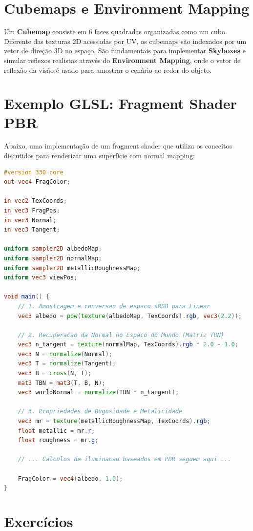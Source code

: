 \section{Cubemaps e Environment Mapping}

Um \textbf{Cubemap} consiste em 6 faces quadradas organizadas como um cubo. 
Diferente das texturas 2D acessadas por UV, os cubemaps são indexados por um vetor de direção 3D no espaço. 
São fundamentais para implementar \textbf{Skyboxes} e simular reflexos realistas através do \textbf{Environment Mapping}, onde o vetor de reflexão da visão é usado para amostrar o cenário ao redor do objeto.

\section{Exemplo GLSL: Fragment Shader PBR}

Abaixo, uma implementação de um fragment shader que utiliza os conceitos discutidos para renderizar uma superfície com normal mapping:

\begin{lstlisting}[language=GLSL, caption={Fragment Shader PBR com Normal Mapping e Espaço Tangente}]
#version 330 core
out vec4 FragColor;

in vec2 TexCoords;
in vec3 FragPos;
in vec3 Normal;
in vec3 Tangent;

uniform sampler2D albedoMap;
uniform sampler2D normalMap;
uniform sampler2D metallicRoughnessMap;
uniform vec3 viewPos;

void main() {
    // 1. Amostragem e conversao de espaco sRGB para Linear
    vec3 albedo = pow(texture(albedoMap, TexCoords).rgb, vec3(2.2));
    
    // 2. Recuperacao da Normal no Espaco do Mundo (Matriz TBN)
    vec3 n_tangent = texture(normalMap, TexCoords).rgb * 2.0 - 1.0;
    vec3 N = normalize(Normal);
    vec3 T = normalize(Tangent);
    vec3 B = cross(N, T);
    mat3 TBN = mat3(T, B, N);
    vec3 worldNormal = normalize(TBN * n_tangent);
    
    // 3. Propriedades de Rugosidade e Metalicidade
    vec3 mr = texture(metallicRoughnessMap, TexCoords).rgb;
    float metallic = mr.r;
    float roughness = mr.g;
    
    // ... Calculos de iluminacao baseados em PBR seguem aqui ...
    
    FragColor = vec4(albedo, 1.0);
}
\end{lstlisting}

\section*{Exercícios}

